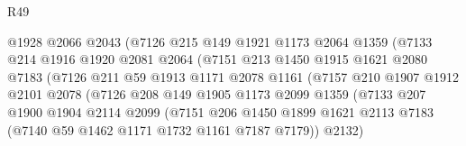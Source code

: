 \begin{lexlean}{R49}
\begin{coremodule}
                              @1928
                              @2066
                              @2043
                              (@7126
                                @215
                                @149
                                @1921
                                @1173
                                @2064
                                @1359
                                (@7133
                                  @214
                                  @1916
                                  @1920
                                  @2081
                                  @2064
                                  (@7151
                                    @213
                                    @1450
                                    @1915
                                    @1621
                                    @2080
                                    @7183
                                    (@7126
                                      @211
                                      @59
                                      @1913
                                      @1171
                                      @2078
                                      @1161
                                      (@7157
                                        @210
                                        @1907
                                        @1912
                                        @2101
                                        @2078
                                        (@7126
                                          @208
                                          @149
                                          @1905
                                          @1173
                                          @2099
                                          @1359
                                          (@7133
                                            @207
                                            @1900
                                            @1904
                                            @2114
                                            @2099
                                            (@7151
                                              @206
                                              @1450
                                              @1899
                                              @1621
                                              @2113
                                              @7183
                                              (@7140 @59 @1462 @1171 @1732 @1161 @7187 @7179))
                                            @2132)

\end{coremodule}
\end{lexlean}

